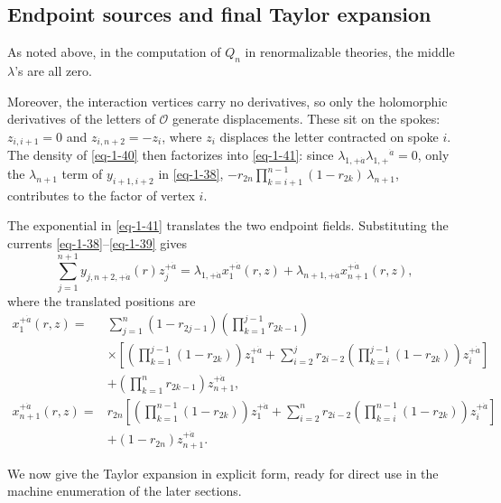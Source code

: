\documentclass[11pt]{article}
\numberwithin{equation}{section}
\numberwithin{figure}{section}
\numberwithin{table}{section}
\begin{document}
\subsection{Endpoint sources and final Taylor expansion}\label{endpoint-sources-and-taylor-expansion}

As noted above, in the computation of $Q_n$ in renormalizable theories, the middle $\lambda$'s are all zero.

Moreover, the interaction vertices carry no derivatives, so only the holomorphic derivatives of the letters of $\mathcal O$ generate displacements. These sit on the spokes: $z_{i,i+1}=0$ and $z_{i,n+2}=-z_i$, where $z_i$ displaces the letter contracted on spoke $i$. The density of \eqref{eq-1-40} then factorizes into \eqref{eq-1-41}: since $\lambda_{1,+\dot a}\lambda_{1,+}{}^{\dot a}=0$, only the $\lambda_{n+1}$ term of $y_{i+1,i+2}$ in \eqref{eq-1-38}, $-r_{2n}\prod_{k=i+1}^{n-1}(1-r_{2k})\,\lambda_{n+1}$, contributes to the factor of vertex $i$.

The exponential in \eqref{eq-1-41} translates the two endpoint fields. Substituting the currents \eqref{eq-1-38}--\eqref{eq-1-39} gives
\begin{equation}\label{eq-fan-output-translation}
\sum_{j=1}^{n+1}y_{j,n+2,+\dot a}(r)z_j^{+\dot a}
=\lambda_{1,+\dot a}x_1^{+\dot a}(r,z)
+\lambda_{n+1,+\dot a}x_{n+1}^{+\dot a}(r,z),
\end{equation}
where the translated positions are
\begin{equation}\label{eq-fan-output-points}
\begin{aligned}
x_1^{+\dot a}(r,z)
={}&\sum_{j=1}^{n}(1-r_{2j-1})
\left(\prod_{k=1}^{j-1}r_{2k-1}\right)\\
&\times\left[
\left(\prod_{k=1}^{j-1}(1-r_{2k})\right)z_1^{+\dot a}
+\sum_{i=2}^{j}r_{2i-2}
\left(\prod_{k=i}^{j-1}(1-r_{2k})\right)z_i^{+\dot a}
\right]\\
&+\left(\prod_{k=1}^{n}r_{2k-1}\right)z_{n+1}^{+\dot a},\\[3pt]
x_{n+1}^{+\dot a}(r,z)
={}&r_{2n}\left[
\left(\prod_{k=1}^{n-1}(1-r_{2k})\right)z_1^{+\dot a}
+\sum_{i=2}^{n}r_{2i-2}
\left(\prod_{k=i}^{n-1}(1-r_{2k})\right)z_i^{+\dot a}
\right]\\
&+(1-r_{2n})z_{n+1}^{+\dot a}.
\end{aligned}
\end{equation}

We now give the Taylor expansion in explicit form, ready for direct use in the machine enumeration of the later sections.
\end{document}
